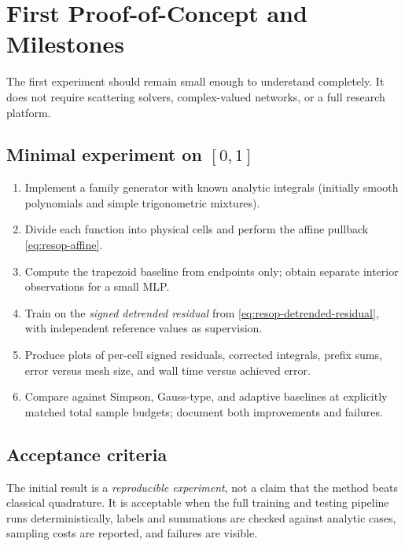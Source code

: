 \section{First Proof-of-Concept and Milestones}
\label{sec:resop-prototype}

The first experiment should remain small enough to understand completely.
It does not require scattering solvers, complex-valued networks, or a
full research platform.

\subsection{Minimal experiment on $[0,1]$}

\begin{enumerate}
    \item Implement a family generator with known analytic integrals
          (initially smooth polynomials and simple trigonometric mixtures).
    \item Divide each function into physical cells and perform the affine
          pullback \eqref{eq:resop-affine}.
    \item Compute the trapezoid baseline from endpoints only; obtain
          separate interior observations for a small MLP.
    \item Train on the \emph{signed detrended residual} from
          \eqref{eq:resop-detrended-residual}, with independent reference
          values as supervision.
    \item Produce plots of per-cell signed residuals, corrected integrals,
          prefix sums, error versus mesh size, and wall time versus
          achieved error.
    \item Compare against Simpson, Gauss-type, and adaptive baselines at
          explicitly matched total sample budgets; document both
          improvements and failures.
\end{enumerate}

\subsection{Acceptance criteria}

The initial result is a \emph{reproducible experiment}, not a claim that
the method beats classical quadrature. It is acceptable when the full
training and testing pipeline runs deterministically, labels and
summations are checked against analytic cases, sampling costs are
reported, and failures are visible.

